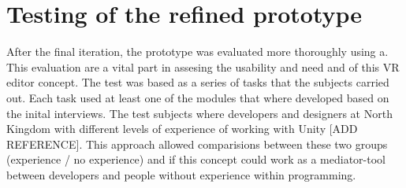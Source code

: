 \section{Testing of the refined prototype}
After the final iteration, the prototype was evaluated more thoroughly using a. This evaluation are a vital part in assesing the usability and need and of this VR editor concept. The test was based as a series of tasks that the subjects carried out. Each task used at least one of the modules that where developed based on the inital interviews. The test subjects where developers and designers at North Kingdom with different levels of experience of working with Unity [ADD REFERENCE]. This approach allowed comparisions between these two groups (experience / no experience) and if this concept could work as a mediator-tool between developers and people without experience within programming.
